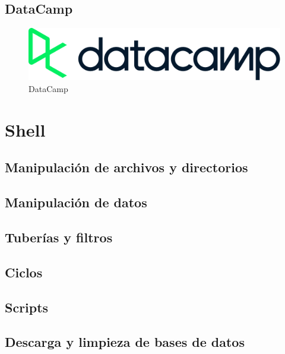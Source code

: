 \documentclass[
]{book}
\begin{document}
\hypertarget{datacamp}{%
\section{DataCamp}\label{datacamp}}

\begin{figure}
\centering
\includegraphics{img/regular.png}
\caption{DataCamp}
\end{figure}

\hypertarget{shell}{%
\chapter{Shell}\label{shell}}

\hypertarget{manipulaciuxf3n-de-archivos-y-directorios}{%
\section{Manipulación de archivos y directorios}\label{manipulaciuxf3n-de-archivos-y-directorios}}

\hypertarget{manipulaciuxf3n-de-datos}{%
\section{Manipulación de datos}\label{manipulaciuxf3n-de-datos}}

\hypertarget{tuberuxedas-y-filtros}{%
\section{Tuberías y filtros}\label{tuberuxedas-y-filtros}}

\hypertarget{ciclos}{%
\section{Ciclos}\label{ciclos}}

\hypertarget{scripts}{%
\section{Scripts}\label{scripts}}

\hypertarget{descarga-y-limpieza-de-bases-de-datos}{%
\section{Descarga y limpieza de bases de datos}\label{descarga-y-limpieza-de-bases-de-datos}}
\end{document}
